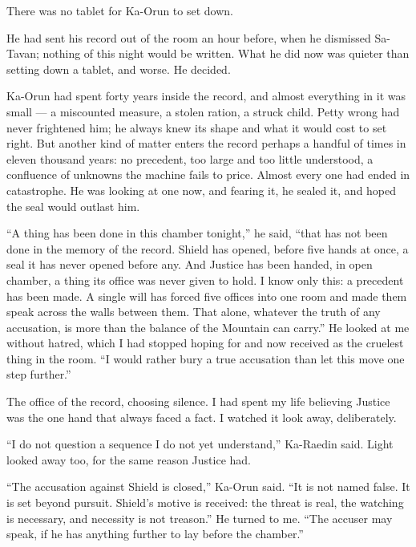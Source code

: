 \ornament
 
There was no tablet for Ka-Orun to set down.\par
 
He had sent his record out of the room an hour before, when he dismissed Sa-Tavan; nothing of this night would be written. What he did now was quieter than setting down a tablet, and worse. He decided.\par
 
Ka-Orun had spent forty years inside the record, and almost everything in it was small --- a miscounted measure, a stolen ration, a struck child. Petty wrong had never frightened him; he always knew its shape and what it would cost to set right. But another kind of matter enters the record perhaps a handful of times in eleven thousand years: no precedent, too large and too little understood, a confluence of unknowns the machine fails to price. Almost every one had ended in catastrophe. He was looking at one now, and fearing it, he sealed it, and hoped the seal would outlast him.\par
 
``A thing has been done in this chamber tonight,'' he said, ``that has not been done in the memory of the record. Shield has opened, before five hands at once, a seal it has never opened before any. And Justice has been handed, in open chamber, a thing its office was never given to hold. I know only this: a precedent has been made. A single will has forced five offices into one room and made them speak across the walls between them. That alone, whatever the truth of any accusation, is more than the balance of the Mountain can carry.'' He looked at me without hatred, which I had stopped hoping for and now received as the cruelest thing in the room. ``I would rather bury a true accusation than let this move one step further.''\par
 
The office of the record, choosing silence. I had spent my life believing Justice was the one hand that always faced a fact. I watched it look away, deliberately.\par
 
``I do not question a sequence I do not yet understand,'' Ka-Raedin said. Light looked away too, for the same reason Justice had.\par
 
``The accusation against Shield is closed,'' Ka-Orun said. ``It is not named false. It is set beyond pursuit. Shield's motive is received: the threat is real, the watching is necessary, and necessity is not treason.'' He turned to me. ``The accuser may speak, if he has anything further to lay before the chamber.''\par
 
